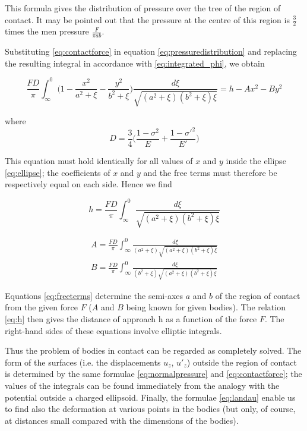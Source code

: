 This formula gives the distribution of pressure over the tree of the region of
contact. It may be pointed out that the pressure at the centre of this region
is $\frac{3}{2}$ times the men pressure $\frac{F}{\pi ab}$.

Substituting \ref{eq:contactforce} in equation \ref{eq:pressuredistribution} and replacing the resulting integral
in accordance with \ref{eq:integrated_phi}, we obtain

\begin{equation}
\frac{FD}{\pi} \int_{\infty}^{0} \Big( 1 - \frac{x^{2}}{a^{2} + \xi} - \frac{y^{2}}{b^{2} + \xi} \Big) \frac{d\xi}{\sqrt{(a^{2} + \xi)(b^{2} + \xi)\xi}} = h - Ax^{2} - By^{2}
\label{eq:D}
\end{equation}

where
\begin{equation*}
D = \frac{3}{4} \Big( \frac{1-\sigma^{2}}{E} + \frac{1-\sigma'^{2}}{E'} \Big)
\end{equation*}

This equation must hold identically for all values of $x$ and $y$ inside the ellipse \ref{eq:ellipse}; the coefficients of $x$ and $y$ and the free terms must therefore be respectively equal on each side. Hence we find

\begin{equation}
h = \frac{FD}{\pi} \int_{\infty}^{0} \frac{d\xi}{\sqrt{(a^{2} + \xi)(b^{2} + \xi)\xi}}
\label{eq:h}
\end{equation}

\begin{equation}
\begin{split}
A = \frac{FD}{\pi} \int_{\infty}^{0} \frac{d\xi}{(a^{2}+\xi)\sqrt{(a^{2} + \xi)(b^{2} + \xi)\xi}} \\
B = \frac{FD}{\pi} \int_{\infty}^{0} \frac{d\xi}{(b^{2}+\xi)\sqrt{(a^{2} + \xi)(b^{2} + \xi)\xi}}
\end{split}
\label{eq:freeterms}
\end{equation}

Equations \ref{eq:freeterms} determine the semi-axes $a$ and $b$ of the region of contact from the given force $F$ ($A$ and $B$ being known for given bodies). The relation \ref{eq:h} then gives the distance of approach h as a function of the force $F$. The right-hand sides of these equations involve elliptic integrals.



Thus the problem of bodies in contact can be regarded as completely
solved. The form of the surfaces (i.e. the displacements $u_{z}$, $u'_{z}$) outside the region of contact is determined by the same formulae \ref{eq:normalpressure} and \ref{eq:contactforce}; the values of the integrals can be found immediately from the analogy with the potential outside a charged ellipsoid. Finally, the formulae \ref{eq:landau} enable us to find also the deformation at various points in the bodies (but only, of course, at distances small compared with the dimensions of the bodies).

